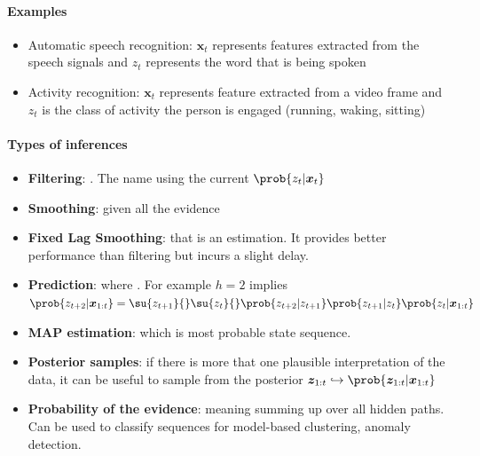 \paragraph{Examples}
\begin{itemize}
    \item Automatic speech recognition: $\bm{x}_{t}$ represents features extracted from the speech 
        signals and $z_{t}$ represents the word that is being spoken
    \item Activity recognition: $\bm{x}_{t}$ represents feature extracted from a video frame and 
        $z_{t}$ is the class of activity the person is engaged (running, waking, sitting)
\end{itemize}

\paragraph{Types of inferences}
\begin{itemize}
    \item \textbf{Filtering}:  . The name
          using the current $\prob{z_{t}|\bm{x}_{t}}$
    \item \textbf{Smoothing}:  
        given all the evidence 
    \item \textbf{Fixed Lag Smoothing}: 
        that is an  estimation.
        It provides better performance than filtering but incurs a slight delay.
    \item \textbf{Prediction}:  where
        . For example $h=2$ implies 
        $\prob{z_{t+2} |\bm{x}_{1:t}} = \su{z_{t+1}}{}\su{z_{t}}{}\prob{z_{t+2}|
        z_{t+1}} \prob{z_{t+1}|z_{t}} \prob{z_{t}|\bm{x}_{1:t}}$
    \item \textbf{MAP estimation}:  which is most probable state sequence.
    \item \textbf{Posterior samples}: if there is more that one plausible 
        interpretation of the data, it can be useful to sample from the posterior 
        $\bm{z}_{1:t} \hookrightarrow \prob{\bm{z}_{1:t}|\bm{x}_{1:t}}$
    \item \textbf{Probability of the evidence}:  meaning summing up 
        over all hidden paths. Can be used to classify sequences for model-based 
        clustering, anomaly detection.
\end{itemize}

